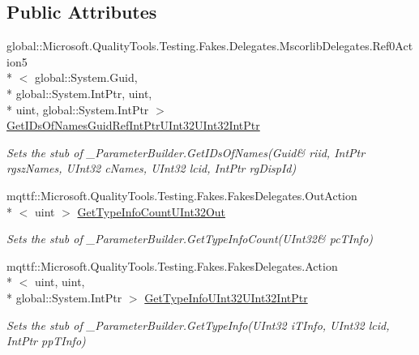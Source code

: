 \subsection*{Public Attributes}
\begin{DoxyCompactItemize}
\item 
global\-::\-Microsoft.\-Quality\-Tools.\-Testing.\-Fakes.\-Delegates.\-Mscorlib\-Delegates.\-Ref0\-Action5\\*
$<$ global\-::\-System.\-Guid, \\*
global\-::\-System.\-Int\-Ptr, uint, \\*
uint, global\-::\-System.\-Int\-Ptr $>$ \hyperlink{class_system_1_1_runtime_1_1_interop_services_1_1_fakes_1_1_stub___parameter_builder_a86d31cd158889841f604e3d29beee061}{Get\-I\-Ds\-Of\-Names\-Guid\-Ref\-Int\-Ptr\-U\-Int32\-U\-Int32\-Int\-Ptr}
\begin{DoxyCompactList}\small\item\em Sets the stub of \-\_\-\-Parameter\-Builder.\-Get\-I\-Ds\-Of\-Names(Guid\& riid, Int\-Ptr rgsz\-Names, U\-Int32 c\-Names, U\-Int32 lcid, Int\-Ptr rg\-Disp\-Id)\end{DoxyCompactList}\item 
mqttf\-::\-Microsoft.\-Quality\-Tools.\-Testing.\-Fakes.\-Fakes\-Delegates.\-Out\-Action\\*
$<$ uint $>$ \hyperlink{class_system_1_1_runtime_1_1_interop_services_1_1_fakes_1_1_stub___parameter_builder_a17b83c33e7e306ff6f37b19d2bc89f43}{Get\-Type\-Info\-Count\-U\-Int32\-Out}
\begin{DoxyCompactList}\small\item\em Sets the stub of \-\_\-\-Parameter\-Builder.\-Get\-Type\-Info\-Count(U\-Int32\& pc\-T\-Info)\end{DoxyCompactList}\item 
mqttf\-::\-Microsoft.\-Quality\-Tools.\-Testing.\-Fakes.\-Fakes\-Delegates.\-Action\\*
$<$ uint, uint, \\*
global\-::\-System.\-Int\-Ptr $>$ \hyperlink{class_system_1_1_runtime_1_1_interop_services_1_1_fakes_1_1_stub___parameter_builder_add3fe003a3202c380d84630b085f7916}{Get\-Type\-Info\-U\-Int32\-U\-Int32\-Int\-Ptr}
\begin{DoxyCompactList}\small\item\em Sets the stub of \-\_\-\-Parameter\-Builder.\-Get\-Type\-Info(\-U\-Int32 i\-T\-Info, U\-Int32 lcid, Int\-Ptr pp\-T\-Info)\end{DoxyCompactList}\item 

\end{DoxyCompactItemize}
